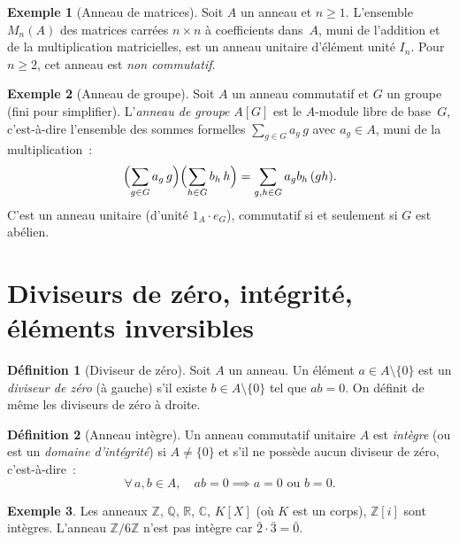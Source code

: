 \documentclass[12pt,a4paper,openany]{book}
\theoremstyle{definition}
\newtheorem{definition}{Définition}[chapter]
\newtheorem{exemple}{Exemple}[chapter]
\newcommand{\Z}{\mathbb{Z}}
\newcommand{\Q}{\mathbb{Q}}
\newcommand{\R}{\mathbb{R}}
\newcommand{\C}{\mathbb{C}}
\begin{document}
\begin{exemple}[Anneau de matrices]\label{ex:anneau-matrices}
Soit $A$ un anneau et $n \geqslant 1$. L'ensemble $M_n(A)$%
 des matrices carrées $n \times n$ à coefficients
dans~$A$, muni de l'addition et de la multiplication matricielles,
est un anneau unitaire d'élément unité $I_n$. Pour $n \geqslant 2$,
cet anneau est \emph{non commutatif}.
\end{exemple}

\begin{exemple}[Anneau de groupe]\label{ex:anneau-groupe}
Soit $A$ un anneau commutatif et $G$ un groupe (fini pour simplifier).
L'\emph{anneau de groupe} $A[G]$ est le
$A$-module libre de base~$G$, c'est-à-dire l'ensemble des sommes
formelles $\sum_{g \in G} a_g \, g$ avec $a_g \in A$, muni de la
multiplication~:
\[
  \Bigl(\sum_{g \in G} a_g \, g\Bigr)\Bigl(\sum_{h \in G} b_h \, h\Bigr)
  = \sum_{g,h \in G} a_g b_h \, (gh).
\]
C'est un anneau unitaire (d'unité $1_A \cdot e_G$), commutatif si et
seulement si $G$ est abélien.
\end{exemple}

\section{Diviseurs de zéro, intégrité, éléments inversibles}%
\label{sec:diviseurs-zero}

\begin{definition}[Diviseur de zéro]\label{def:diviseur-zero}
Soit $A$ un anneau. Un élément $a \in A \setminus \{0\}$ est un
\emph{diviseur de zéro} (à gauche) s'il existe $b \in A \setminus \{0\}$
tel que $ab = 0$. On définit de même les diviseurs de zéro à droite.
\end{definition}

\begin{definition}[Anneau intègre]\label{def:anneau-integre}
Un anneau commutatif unitaire $A$ est \emph{intègre} (ou est un
\emph{domaine d'intégrité}) si $A \neq \{0\}$ et s'il ne possède
aucun diviseur de zéro, c'est-à-dire~:
\[
  \forall\, a, b \in A, \quad ab = 0 \implies a = 0 \text{ ou } b = 0.
\]
\end{definition}

\begin{exemple}\label{ex:integrite}
Les anneaux $\Z$, $\Q$, $\R$, $\C$, $K[X]$ (où $K$ est un corps),
$\Z[i]$ sont intègres. L'anneau $\Z/6\Z$ n'est pas intègre car
$\bar{2} \cdot \bar{3} = \bar{0}$.
\end{exemple}
\end{document}
